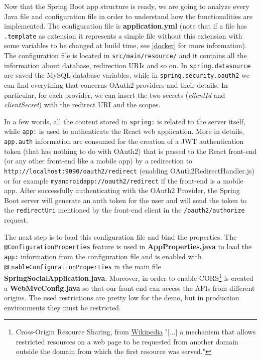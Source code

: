 \noindent Now that the Spring Boot app structure is ready, we are going to analyze every Java file and configuration file in order to understand how the functionalities are implemented. The configuration file is \textbf{application.yml} (note that if a file has \texttt{.template} as extension it represents a simple file without this extension with some variables to be changed at build time, see \ref{docker} for more information). The configuration file is located in \texttt{src/main/resource/} and it contains all the information about database, redirection URIs and so on. In \texttt{spring.datasource} are saved the MySQL database variables, while in \texttt{spring.security.oauth2} we can find everything that concerns OAuth2 providers and their details. In particular, for each provider, we can insert the two secrets (\textit{clientId} and \textit{clientSecret}) with the redirect URI and the scopes.

In a few words, all the content stored in \texttt{spring:} is related to the server itself, while \texttt{app:} is used to authenticate the React web application. More in details, \texttt{app.auth} information are consumed for the creation of a JWT authentication token (that has nothing to do with OAuth2) that is passed to the React front-end (or any other front-end like a mobile app) by a redirection to \\ \texttt{http://localhost:9090/oauth2/redirect} (enabling OAuth2RedirectHandler.js) or for example \texttt{myandroidapp://oauth2/redirect} if the front-end is a mobile app.
After successfully authenticating with the OAuth2 Provider, the Spring Boot server will generate an auth token for the user and will send the token to the \texttt{redirectUri} mentioned by the front-end client in the \texttt{/oauth2/authorize} request. 

The next step is to load this configuration file and bind the properties. The \\ \texttt{@ConfigurationProperties} feature is used in \textbf{AppProperties.java} to load the \texttt{app:} information from the configuration file and is enabled with  \texttt{@EnableConfigurationProperties} in the main file \textbf{SpringSocialApplication.java}. Moreover, in order to enable CORS\footnote{Cross-Origin Resource Sharing, from \href{https://en.wikipedia.org/wiki/Cross-origin_resource_sharing}{Wikipedia} "[...] a mechanism that allows restricted resources on a web page to be requested from another domain outside the domain from which the first resource was served."} is created a \textbf{WebMvcConfig.java}  so that our front-end can access the APIs from different origins. The used restrictions are pretty low for the demo, but in production environments they must be restricted.

